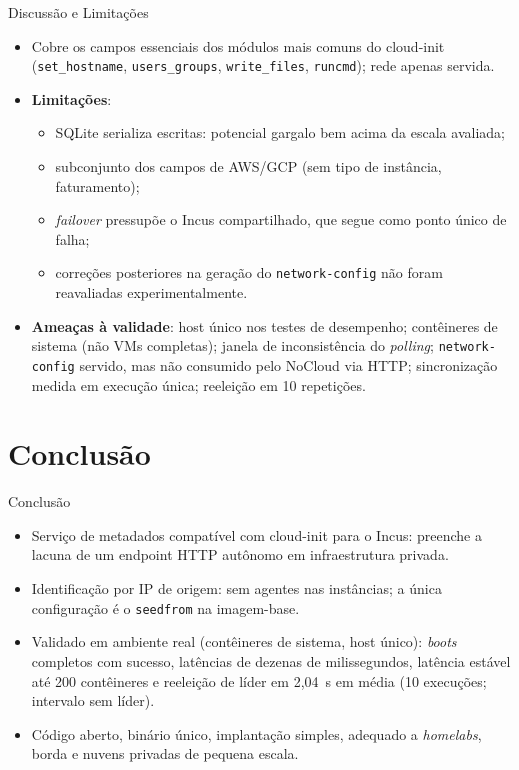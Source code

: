\documentclass[aspectratio=169,xcolor=table]{beamer}
\begin{document}
\begin{frame}{Discussão e Limitações}
    \begin{itemize}
        \item Cobre os campos essenciais dos módulos mais comuns do cloud-init
              (\texttt{set\_hostname}, \texttt{users\_groups}, \texttt{write\_files},
              \texttt{runcmd}); rede apenas servida.
        \item \textbf{Limitações}:
        \begin{itemize}
            \item SQLite serializa escritas: potencial gargalo bem acima da escala
                  avaliada;
            \item subconjunto dos campos de AWS/GCP (sem tipo de instância,
                  faturamento);
            \item \textit{failover} pressupõe o Incus compartilhado, que segue como
                  ponto único de falha;
            \item correções posteriores na geração do \texttt{network-config} não
                  foram reavaliadas experimentalmente.
        \end{itemize}
        \item \textbf{Ameaças à validade}: host único nos testes de desempenho;
              contêineres de sistema (não VMs completas); janela de inconsistência do
              \textit{polling}; \texttt{network-config} servido, mas não consumido
              pelo NoCloud via HTTP; sincronização medida em execução única;
              reeleição em 10 repetições.
    \end{itemize}
\end{frame}

\section{Conclusão}
\sectionframe

\begin{frame}{Conclusão}
    \begin{itemize}
        \item Serviço de metadados compatível com cloud-init para o Incus: preenche a
              lacuna de um endpoint HTTP autônomo em infraestrutura privada.
        \item Identificação por IP de origem: sem agentes nas instâncias; a única
              configuração é o \texttt{seedfrom} na imagem-base.
        \item Validado em ambiente real (contêineres de sistema, host único):
              \textit{boots} completos com sucesso, latências de dezenas de
              milissegundos, latência estável até 200 contêineres e reeleição de
              líder em 2{,}04~s em média (10 execuções; intervalo sem líder).
        \item Código aberto, binário único, implantação simples, adequado a
              \textit{homelabs}, borda e nuvens privadas de pequena escala.
    \end{itemize}
\end{frame}
\end{document}
